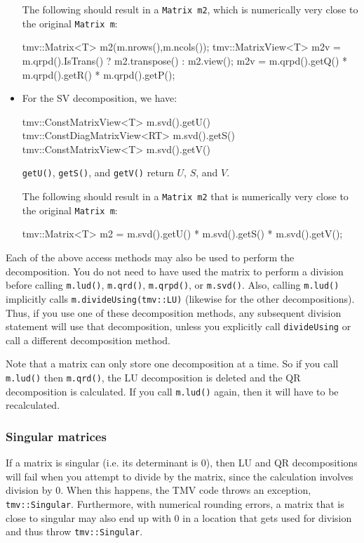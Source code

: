 \documentclass[twoside,letterpaper,11pt]{article}
\renewcommand{\tt}[1]{{\lstinline {#1}}}
\begin{document}
\begin{itemize}
The following should result in a \tt{Matrix m2}, which is numerically very close to
the original \tt{Matrix m}:
\begin{tmvcode}
tmv::Matrix<T> m2(m.nrows(),m.ncols());
tmv::MatrixView<T> m2v = 
      m.qrpd().IsTrans() ? m2.transpose() : m2.view();
m2v = m.qrpd().getQ() * m.qrpd().getR() * m.qrpd().getP();
\end{tmvcode}

\item
For the SV decomposition, we have:
\begin{tmvcode}
tmv::ConstMatrixView<T> m.svd().getU()
tmv::ConstDiagMatrixView<RT> m.svd().getS()
tmv::ConstMatrixView<T> m.svd().getV()
\end{tmvcode}
\tt{getU()}, \tt{getS()}, and \tt{getV()} return $U$, $S$, and $V$.

The following should result in a \tt{Matrix m2}
that is numerically very close to the original \tt{Matrix m}:
\begin{tmvcode}
tmv::Matrix<T> m2 = m.svd().getU() * m.svd().getS() * m.svd().getV();
\end{tmvcode}
\end{itemize}

Each of the above access methods may also be used to perform the decomposition.
You do not need to have used the matrix to perform a division before
calling \tt{m.lud()}, \tt{m.qrd()}, \tt{m.qrpd()}, or \tt{m.svd()}.  Also, calling
\tt{m.lud()} implicitly calls \tt{m.divideUsing(tmv::LU)} (likewise for the other 
decompositions).  Thus, if you use one of these decomposition methods, any
subsequent division statement will use that decomposition, unless you explicitly
call \tt{divideUsing} or call a different decomposition method.

Note that a matrix can only store one decomposition at a time.  So if you 
call \tt{m.lud()} then \tt{m.qrd()}, the LU decomposition is deleted
and the QR decomposition is calculated.  If you call \tt{m.lud()} again, then 
it will have to be recalculated.

\subsubsection{Singular matrices}
\label{Matrix_Division_Singular}

If a matrix is singular (i.e. its determinant is 0), 
then LU and QR decompositions
will fail when you attempt to divide by the matrix, since the 
calculation involves division by 0.  When this happens, the TMV code
throws an exception,
\tt{tmv::Singular}. 
Furthermore, with numerical rounding errors, a matrix
that is close to singular may also end up with 0 in a location that gets
used for division and thus throw \tt{tmv::Singular}.
\end{document}
